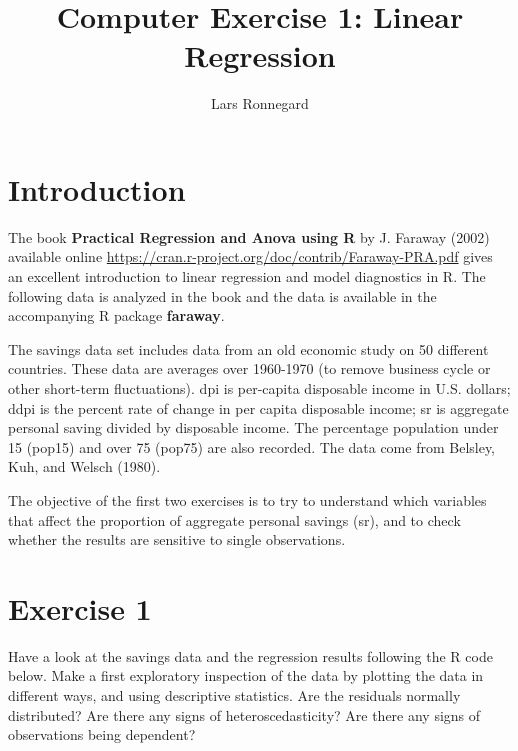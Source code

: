\documentclass[10pt,a4paper,english]{report}
\begin{document}
\title{Computer Exercise 1: Linear Regression}
\author{Lars Ronnegard}
\maketitle
\section*{Introduction}
The book \textbf{Practical Regression and Anova using R} by J. Faraway (2002)  available online \url{https://cran.r-project.org/doc/contrib/Faraway-PRA.pdf} gives an excellent introduction to linear regression and model diagnostics in R. The following data is analyzed in the book and the data is available in the accompanying  R package \textbf{faraway}.

The savings data set includes data from an old economic study on 50 different countries. These data
are averages over 1960-1970 (to remove business cycle or other short-term fluctuations). dpi is per-capita
disposable income in U.S. dollars; ddpi is the percent rate of change in per capita disposable income; sr
is aggregate personal saving divided by disposable income. The percentage population under 15 (pop15)
and over 75 (pop75) are also recorded. The data come from Belsley, Kuh, and Welsch (1980).

The objective of the first two exercises is to try to understand which variables that affect the proportion of aggregate personal savings (sr), and to check whether the results are sensitive to single observations.

\section*{Exercise 1}
Have a look at the savings data and the regression results following the R code below. 
Make a first exploratory inspection of the data by plotting the data in different ways, and using descriptive statistics.
Are the residuals normally distributed?
Are there any signs of heteroscedasticity?
Are there any signs of observations being dependent?

\begin{Schunk}


\end{Schunk}
\end{document}
